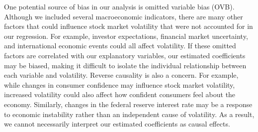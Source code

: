 \indent One potential source of bias in our analysis is omitted variable bias (OVB). Although we included several macroeconomic indicators, there are many other factors that could influence stock market volatility that were not accounted for in our regression. For example, investor expectations, financial market uncertainty, and international economic events could all affect volatility. If these omitted factors are correlated with our explanatory variables, our estimated coefficients may be biased, making it difficult to isolate the individual relationship between each variable and volatility. Reverse causality is also a concern. For example, while changes in consumer confidence may influence stock market volatility, increased volatility could also affect how confident consumers feel about the economy. Similarly, changes in the federal reserve interest rate may be a response to economic instability rather than an independent cause of volatility. As a result, we cannot necessarily interpret our estimated coefficients as causal effects. 

